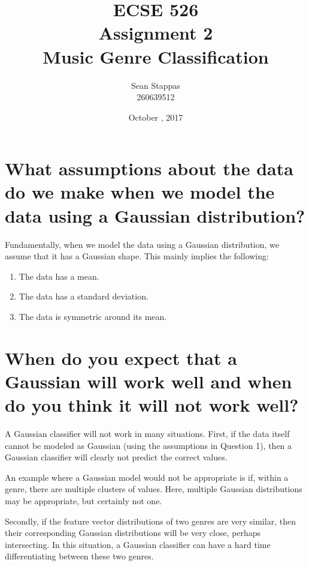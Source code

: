 \documentclass[a4paper,titlepage]{article}
\title{
	\textbf{ECSE 526 \\ Assignment 2}
	\\ \large Music Genre Classification
}
\author{Sean Stappas \\ 260639512}
\date{October \nth{19}, 2017}
\begin{document}
	\sloppy
	\maketitle
	\twocolumn
	
	\section{What assumptions about the data do we make when we model the data using a Gaussian distribution?}
	
	Fundamentally, when we model the data using a Gaussian distribution, we assume that it has a Gaussian shape. This mainly implies the following:
	
	\begin{enumerate}
		\item The data has a mean.
		\item The data has a standard deviation.
		\item The data is symmetric around its mean.
	\end{enumerate}
	
	
	\section{When do you expect that a Gaussian will work well and when do you think it will not work well?}
	
	A Gaussian classifier will not work in many situations. First, if the data itself cannot be modeled as Gaussian (using the assumptions in Question 1), then a Gaussian classifier will clearly not predict the correct values.
	
	
	An example where a Gaussian model would not be appropriate is if, within a genre, there are multiple clusters of values. Here, multiple Gaussian distributions may be appropriate, but certainly not one.
	
	
	Secondly, if the feature vector distributions of two genres are very similar, then their corresponding Gaussian distributions will be very close, perhaps intersecting. In this situation, a Gaussian classifier can have a hard time differentiating between these two genres.
	
\end{document}
